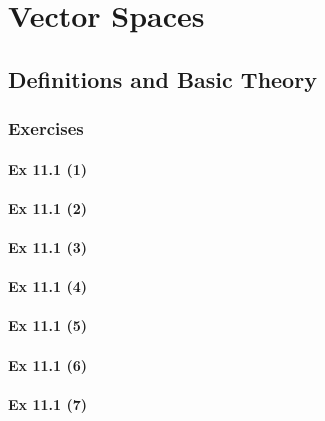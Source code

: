 \setcounter{chapter}{0}
\renewcommand{\thechapter}{11}
\chapter{Vector Spaces}\label{ch:11}
\setcounter{equation}{0}	        %

\section{Definitions and  Basic Theory}\label{sec:11.1}	
\subsection*{Exercises}\label{sec:11.1_Exercises}

\subsubsection{Ex 11.1 (1)}\label{sec:Ex_11.1.1}

\subsubsection{Ex 11.1 (2)}\label{sec:Ex_11.1.2}

\subsubsection{Ex 11.1 (3)}\label{sec:Ex_11.1.3}

\subsubsection{Ex 11.1 (4)}\label{sec:Ex_11.1.4}

\subsubsection{Ex 11.1 (5)}\label{sec:Ex_11.1.5}

\subsubsection{Ex 11.1 (6)}\label{sec:Ex_11.1.6}

\subsubsection{Ex 11.1 (7)}\label{sec:Ex_11.1.7}

